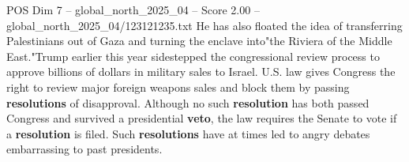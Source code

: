 \begin{textsample}{POS Dim 7 – global\_north\_2025\_04 – Score 2.00 – global\_north\_2025\_04/123121235.txt}
He has also floated the idea of transferring Palestinians out of Gaza and turning the enclave into"the Riviera of the Middle East."Trump earlier this year sidestepped the congressional review process to approve billions of dollars in military sales to Israel.
U.S. law gives Congress the right to review major foreign weapons sales and block them by passing \textbf{resolutions} of disapproval.
Although no such \textbf{resolution} has both passed Congress and survived a presidential \textbf{veto}, the law requires the Senate to vote if a \textbf{resolution} is filed.
Such \textbf{resolutions} have at times led to angry debates embarrassing to past presidents.

\end{textsample}
